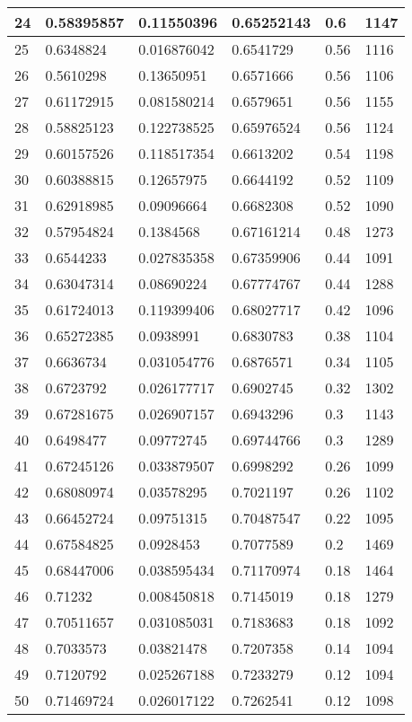 \begin{longtable}{|l|l|l|l|l|l|}
24 & 0.58395857 & 0.11550396 & 0.65252143 & 0.6 & 1147 \\ \hline 
25 & 0.6348824 & 0.016876042 & 0.6541729 & 0.56 & 1116 \\ \hline 
26 & 0.5610298 & 0.13650951 & 0.6571666 & 0.56 & 1106 \\ \hline 
27 & 0.61172915 & 0.081580214 & 0.6579651 & 0.56 & 1155 \\ \hline 
28 & 0.58825123 & 0.122738525 & 0.65976524 & 0.56 & 1124 \\ \hline 
29 & 0.60157526 & 0.118517354 & 0.6613202 & 0.54 & 1198 \\ \hline 
30 & 0.60388815 & 0.12657975 & 0.6644192 & 0.52 & 1109 \\ \hline 
31 & 0.62918985 & 0.09096664 & 0.6682308 & 0.52 & 1090 \\ \hline 
32 & 0.57954824 & 0.1384568 & 0.67161214 & 0.48 & 1273 \\ \hline 
33 & 0.6544233 & 0.027835358 & 0.67359906 & 0.44 & 1091 \\ \hline 
34 & 0.63047314 & 0.08690224 & 0.67774767 & 0.44 & 1288 \\ \hline 
35 & 0.61724013 & 0.119399406 & 0.68027717 & 0.42 & 1096 \\ \hline 
36 & 0.65272385 & 0.0938991 & 0.6830783 & 0.38 & 1104 \\ \hline 
37 & 0.6636734 & 0.031054776 & 0.6876571 & 0.34 & 1105 \\ \hline 
38 & 0.6723792 & 0.026177717 & 0.6902745 & 0.32 & 1302 \\ \hline 
39 & 0.67281675 & 0.026907157 & 0.6943296 & 0.3 & 1143 \\ \hline 
40 & 0.6498477 & 0.09772745 & 0.69744766 & 0.3 & 1289 \\ \hline 
41 & 0.67245126 & 0.033879507 & 0.6998292 & 0.26 & 1099 \\ \hline 
42 & 0.68080974 & 0.03578295 & 0.7021197 & 0.26 & 1102 \\ \hline 
43 & 0.66452724 & 0.09751315 & 0.70487547 & 0.22 & 1095 \\ \hline 
44 & 0.67584825 & 0.0928453 & 0.7077589 & 0.2 & 1469 \\ \hline 
45 & 0.68447006 & 0.038595434 & 0.71170974 & 0.18 & 1464 \\ \hline 
46 & 0.71232 & 0.008450818 & 0.7145019 & 0.18 & 1279 \\ \hline 
47 & 0.70511657 & 0.031085031 & 0.7183683 & 0.18 & 1092 \\ \hline 
48 & 0.7033573 & 0.03821478 & 0.7207358 & 0.14 & 1094 \\ \hline 
49 & 0.7120792 & 0.025267188 & 0.7233279 & 0.12 & 1094 \\ \hline 
50 & 0.71469724 & 0.026017122 & 0.7262541 & 0.12 & 1098 \\ \hline 
\end{longtable}